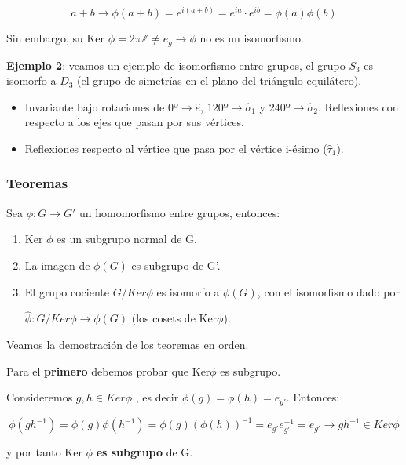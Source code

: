 \documentclass{article}
\begin{document}
 $$a+b \longrightarrow \phi (a+b) =e^{i(a+b)}=e^{ia}\cdot e^{ib}=\phi(a)\phi (b)$$

 Sin embargo, su Ker $\phi =2\pi \mathds{Z}\neq e_g \rightarrow \phi $ no es un isomorfismo.

 \bigskip
 \textbf{Ejemplo 2}: veamos un ejemplo de isomorfismo entre grupos, el grupo $S_3$ es isomorfo a $D_3$ (el grupo de simetrías en el plano del triángulo equilátero).

 \begin{itemize}
     \item Invariante bajo rotaciones de  $0º \rightarrow \hat{e}$, $120º \rightarrow \hat{\sigma}_1$ y $240º \rightarrow \hat{\sigma} _2$. Reflexiones con respecto a los ejes que pasan por sus vértices.

     \item  Reflexiones respecto al vértice que pasa por el vértice i-ésimo ($\hat{\tau}_1$).
 \end{itemize}

 \subsubsection{Teoremas}

 Sea $\phi : G\rightarrow G'$ un homomorfismo entre grupos, entonces:

      \begin{enumerate}
\item Ker $\phi$ es un subgrupo normal de G.

\item La imagen de $\phi (G)$ es subgrupo de G'.

\item El grupo cociente $G/Ker\phi$ es isomorfo a $\phi (G)$, con el isomorfismo dado por

$\hat{\phi} : G/Ker\phi \rightarrow \phi (G)$ (los cosets de Ker$\phi$).

 \end{enumerate}

 Veamos la demostración de los teoremas en orden.

 \bigskip
 Para el \textbf{primero} debemos probar que Ker$\phi$ es subgrupo.

 \smallskip
 Consideremos $g,h\in Ker\phi $ , es decir $\phi (g) =\phi (h)=e_{g'}$. Entonces:

 $$\phi (gh^{-1})=\phi (g)\phi (h^{-1})=\phi (g)(\phi(h))^{-1}=e_{g'}e_{g'}^{-1}=e_{g'} \rightarrow gh^{-1} \in Ker \phi $$

 y por tanto Ker $\phi$ \textbf{es subgrupo} de G.
 \smallskip
\end{document}
